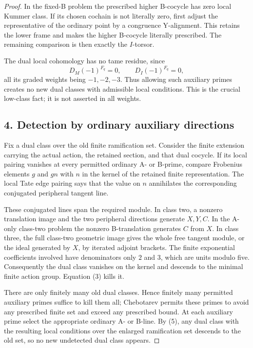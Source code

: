 \documentclass[11pt]{article}
\begin{document}
\begin{proof}
In the fixed-B problem the prescribed higher B-cocycle has zero local Kummer class. If its chosen cochain is not literally zero, first adjust the representative of the ordinary point by a congruence Y-alignment. This retains the lower frame and makes the higher B-cocycle literally prescribed. The remaining comparison is then exactly the $I$-torsor.

The dual local cohomology has no tame residue, since
\[
 D_M(-1)^{F_q}=0,\qquad D_I(-1)^{F_q}=0,
 \tag{5}
\]
all its graded weights being $-1,-2,-3$. Thus allowing such auxiliary primes creates no new dual classes with admissible local conditions. This is the crucial low-class fact; it is not asserted in all weights.

\subsection*{4. Detection by ordinary auxiliary directions}
Fix a dual class over the old finite ramification set. Consider the finite extension carrying the actual action, the retained section, and that dual cocycle. If its local pairing vanishes at every permitted ordinary A- or B-prime, compare Frobenius elements $g$ and $gn$ with $n$ in the kernel of the retained finite representation. The local Tate edge pairing says that the value on $n$ annihilates the corresponding conjugated peripheral tangent line.

These conjugated lines span the required module. In class two, a nonzero translation image and the two peripheral directions generate $X,Y,C$. In the A-only class-two problem the nonzero B-translation generates $C$ from $X$. In class three, the full class-two geometric image gives the whole free tangent module, or the ideal generated by $X$, by iterated adjoint brackets. The finite exponential coefficients involved have denominators only $2$ and $3$, which are units modulo five. Consequently the dual class vanishes on the kernel and descends to the minimal finite action group. Equation (3) kills it.

There are only finitely many old dual classes. Hence finitely many permitted auxiliary primes suffice to kill them all; Chebotarev permits these primes to avoid any prescribed finite set and exceed any prescribed bound. At each auxiliary prime select the appropriate ordinary A- or B-line. By (5), any dual class with the resulting local conditions over the enlarged ramification set descends to the old set, so no new undetected dual class appears.


\end{proof}
\end{document}
